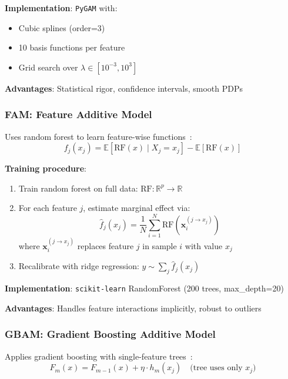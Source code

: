 \documentclass[twocolumn]{article}
\begin{document}
\textbf{Implementation}: \texttt{PyGAM} with:
\begin{itemize}
\item Cubic splines (order=3)
\item 10 basis functions per feature
\item Grid search over $\lambda \in [10^{-3}, 10^{3}]$
\end{itemize}

\textbf{Advantages}: Statistical rigor, confidence intervals, smooth PDPs

\subsubsection{FAM: Feature Additive Model}

Uses random forest to learn feature-wise functions~\cite{hooker2007gam}:
\begin{equation}
f_j(x_j) = \mathbb{E}[\text{RF}(x) \mid X_j = x_j] - \mathbb{E}[\text{RF}(x)]
\end{equation}

\textbf{Training procedure}:
\begin{enumerate}
\item Train random forest on full data: $\text{RF}: \mathbb{R}^p \to \mathbb{R}$
\item For each feature $j$, estimate marginal effect via:
\begin{equation}
\hat{f}_j(x_j) = \frac{1}{N} \sum_{i=1}^{N} \text{RF}(\mathbf{x}_i^{(j \to x_j)})
\end{equation}
where $\mathbf{x}_i^{(j \to x_j)}$ replaces feature $j$ in sample $i$ with value $x_j$
\item Recalibrate with ridge regression: $y \sim \sum_j \hat{f}_j(x_j)$
\end{enumerate}

\textbf{Implementation}: \texttt{scikit-learn} RandomForest (200 trees, max\_depth=20)

\textbf{Advantages}: Handles feature interactions implicitly, robust to outliers

\subsubsection{GBAM: Gradient Boosting Additive Model}

Applies gradient boosting with single-feature trees~\cite{lou2012intelligible}:
\begin{equation}
F_m(x) = F_{m-1}(x) + \eta \cdot h_m(x_j) \quad \text{(tree uses only } x_j \text{)}
\end{equation}
\end{document}
